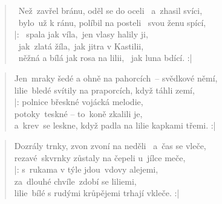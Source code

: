 \begin{song}{}
\begin{verse}
   ~Než~zavřel bránu, oděl se do oceli  ~a~zhasil svíci,     \\
   ~bylo~už k ránu, políbil na posteli  ~svou ženu spící,     \\
   |: ~spala jak víla,~jen vlasy halily ji, \\
     ~jak~zlatá žíla,~jak jitra v Kastilii, \\
      ~něžná a bílá jak rosa na lilii,  ~jak luna bdící.     :|
\end{verse}
\begin{verse}
   Jen~mraky šedé a ohně na pahorcích~-- svědkové němí,       \\
   lilie~bledé svítily na praporcích, když táhli zemí,       \\
   |: polnice břeskné vojácká melodie, \\
      potoky~teskné -- to~koně zkalili je, \\
      a~krev~se leskne, když padla na lilie kapkami třemi.     :|
\end{verse}
\begin{verse}
   Dozrály trnky, zvon zvoní na neděli ~a~čas se vleče,     \\
   rezavé~skvrnky zůstaly na čepeli u~jílce meče,     \\
   |: s~rukama v týle jdou~vdovy alejemi, \\
      za~dlouhé chvíle~zdobí se liliemi, \\
      lilie~bílé s rudými krůpějemi trhají  vkleče.     :|
\end{verse}
\end{song}
\pagebreak

